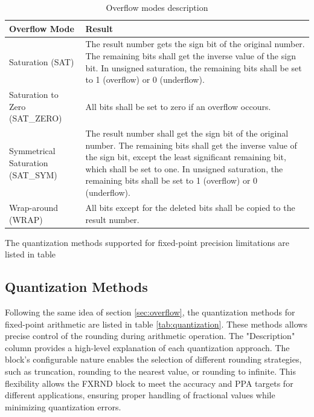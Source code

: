 \begin{table}[h]
    \centering
    \begin{tabular}{|>{\centering\arraybackslash}p{2cm}|
                     >{\centering\arraybackslash}p{6cm}|}
        \arrayrulecolor{sandnavy!50}\hline
        \rowcolor{sandnavy!50}\hline
        \textcolor{sandwhite}{\textbf{Overflow Mode}} &
        \textcolor{sandwhite}{\textbf{Result}} \\ \hline
        Saturation (\small{SAT}) & The result number gets the sign bit of the original number. The remaining bits shall get the inverse value of the sign bit. In unsigned saturation, the remaining bits shall be set to 1 (overflow) or 0 (underflow).\\ \hline
        Saturation to Zero (\small{SAT\_ZERO}) & All bits shall be set to zero if an overflow occours.\\ \hline
        Symmetrical Saturation (\small{SAT\_SYM}) & The result number shall get the sign bit of the original number. The remaining bits shall get the inverse value of the sign bit, except the least significant remaining bit, which shall be set to one. In unsigned saturation, the remaining bits shall be set to 1 (overflow) or 0 (underflow). \\ \hline
        Wrap-around (\small{WRAP}) & All bits except for the deleted bits shall be copied to the result number. \\ \hline
    \end{tabular}
    \caption{Overflow modes description}
    \label{tab:overflow}
\end{table}

The quantization methods supported for fixed-point precision limitations are listed in table 
\subsection{Quantization Methods}
\label{sec:quantization}
Following the same idea of section \ref{sec:overflow}, the quantization methods for fixed-point arithmetic are listed in table \ref{tab:quantization}. These methods allows precise control of the rounding during arithmetic operation. The "Description" column provides a high-level explanation of each quantization approach. The block’s configurable nature enables the selection of different rounding strategies, such as truncation, rounding to the nearest value, or rounding to infinite. This flexibility allows the FXRND block to meet the accuracy and PPA targets for different applications, ensuring proper handling of fractional values while minimizing quantization errors.

